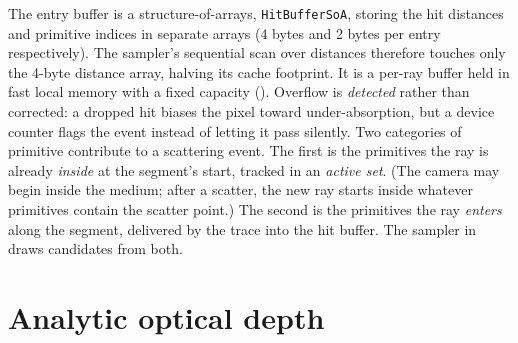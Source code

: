 The entry buffer is a structure-of-arrays, \texttt{HitBufferSoA}, storing the hit distances and
primitive indices in separate arrays (\num{4} bytes and \num{2} bytes per entry respectively). The
sampler's sequential scan over distances therefore touches only the \num{4}-byte distance array,
halving its cache footprint. It is a per-ray buffer held in fast local memory
with a fixed capacity (). Overflow is \emph{detected} rather than corrected: a
dropped hit biases the pixel toward under-absorption, but a device counter flags the event instead of
letting it pass silently. Two categories of primitive contribute to a scattering event. The first is
the primitives the ray is already \emph{inside} at the segment's start, tracked in an \emph{active
set}. (The camera may begin inside the medium; after a scatter, the new ray starts inside whatever
primitives contain the scatter point.) The second is the primitives the ray \emph{enters} along the
segment, delivered by the trace into the
hit buffer. The sampler in  draws candidates from both.

\section{Analytic optical depth}
\label{sec:analytic-od}

